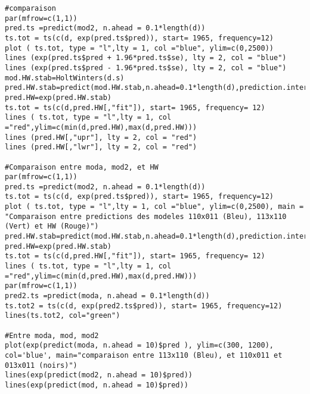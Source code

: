 \documentclass[11pt,a4paper]{article}
\begin{document}
\begin{lstlisting}[breaklines]
#comparaison
par(mfrow=c(1,1))
pred.ts =predict(mod2, n.ahead = 0.1*length(d))
ts.tot = ts(c(d, exp(pred.ts$pred)), start= 1965, frequency=12)
plot ( ts.tot, type = "l",lty = 1, col ="blue", ylim=c(0,2500))
lines (exp(pred.ts$pred + 1.96*pred.ts$se), lty = 2, col = "blue")
lines (exp(pred.ts$pred - 1.96*pred.ts$se), lty = 2, col = "blue")
mod.HW.stab=HoltWinters(d.s)
pred.HW.stab=predict(mod.HW.stab,n.ahead=0.1*length(d),prediction.interval=TRUE)
pred.HW=exp(pred.HW.stab)
ts.tot = ts(c(d,pred.HW[,"fit"]), start= 1965, frequency= 12)
lines ( ts.tot, type = "l",lty = 1, col ="red",ylim=c(min(d,pred.HW),max(d,pred.HW)))
lines (pred.HW[,"upr"], lty = 2, col = "red")
lines (pred.HW[,"lwr"], lty = 2, col = "red")

#Comparaison entre moda, mod2, et HW
par(mfrow=c(1,1))
pred.ts =predict(mod2, n.ahead = 0.1*length(d))
ts.tot = ts(c(d, exp(pred.ts$pred)), start= 1965, frequency=12)
plot ( ts.tot, type = "l",lty = 1, col ="blue", ylim=c(0,2500), main = "Comparaison entre predictions des modeles 110x011 (Bleu), 113x110 (Vert) et HW (Rouge)")
pred.HW.stab=predict(mod.HW.stab,n.ahead=0.1*length(d),prediction.interval=TRUE)
pred.HW=exp(pred.HW.stab)
ts.tot = ts(c(d,pred.HW[,"fit"]), start= 1965, frequency= 12)
lines ( ts.tot, type = "l",lty = 1, col ="red",ylim=c(min(d,pred.HW),max(d,pred.HW)))
par(mfrow=c(1,1))
pred2.ts =predict(moda, n.ahead = 0.1*length(d))
ts.tot2 = ts(c(d, exp(pred2.ts$pred)), start= 1965, frequency=12)
lines(ts.tot2, col="green")

#Entre moda, mod, mod2
plot(exp(predict(moda, n.ahead = 10)$pred ), ylim=c(300, 1200), col='blue', main="comparaison entre 113x110 (Bleu), et 110x011 et 013x011 (noirs)")
lines(exp(predict(mod2, n.ahead = 10)$pred))
lines(exp(predict(mod, n.ahead = 10)$pred))



\end{lstlisting}
\end{document}
